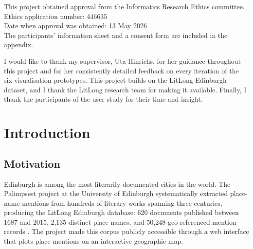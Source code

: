 \documentclass[logo,msc]{infthesis}
\begin{document}
\begin{preliminary}
\begin{ethics}
This project obtained approval from the Informatics Research Ethics committee.\\
Ethics application number: 446635\\
Date when approval was obtained: 13 May 2026\\
The participants' information sheet and a consent form are included in the appendix.\\
\standarddeclaration
\end{ethics}
 
\begin{acknowledgements}
I would like to thank my supervisor, Uta Hinrichs, for her guidance throughout this project and for her consistently detailed feedback on every iteration of the six visualisation prototypes. This project builds on the LitLong Edinburgh dataset, and I thank the LitLong research team for making it available. Finally, I thank the participants of the user study for their time and insight.
\end{acknowledgements}
 
\tableofcontents
\listoffigures
 
\end{preliminary}
 
 
\chapter{Introduction}
 
\section{Motivation}
 
Edinburgh is among the most literarily documented cities in the world. The Palimpsest project at the University of Edinburgh systematically extracted place-name mentions from hundreds of literary works spanning three centuries, producing the LitLong Edinburgh database: 620 documents published between 1687 and 2015, 2,135 distinct place names, and 50,248 geo-referenced mention records \cite{anderson2016}. The project made this corpus publicly accessible through a web interface that plots place mentions on an interactive geographic map.
 
\end{document}
